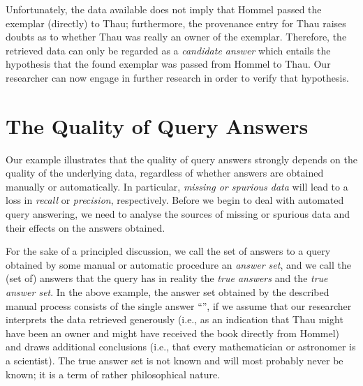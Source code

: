 Unfortunately, the data available does not imply that \foreignlanguage{ngerman}{Hommel} passed the exemplar (directly) to \foreignlanguage{ngerman}{Thau};
furthermore, the provenance entry for \foreignlanguage{ngerman}{Thau} raises doubts as to whether \foreignlanguage{ngerman}{Thau} was really an owner of the exemplar.
Therefore, the retrieved data can only be regarded as a \emph{candidate answer}
which entails the hypothesis that the found exemplar was passed from \foreignlanguage{ngerman}{Hommel} to \foreignlanguage{ngerman}{Thau}.
Our researcher can now engage in further research in order to verify that hypothesis.


\section{The Quality of Query Answers}
\label{sec:quality_of_answers}

Our example illustrates that the quality of query answers
strongly depends on the quality of the underlying data,
regardless of whether answers are obtained manually or automatically. 
In particular, \emph{missing or spurious data} will lead to 
a loss in \emph{recall} or \emph{precision}, respectively.
Before we begin to deal with automated query answering,
we need to analyse the sources of missing or spurious data and their effects on the answers obtained.

For the sake of a principled discussion, we call the set of answers to a query obtained by some manual or automatic procedure
an \emph{answer set}, and we call the (set of) answers that the query has in reality the \emph{true answers} and the \emph{true answer set}.
In the above example, the answer set obtained by the described manual process consists of the single answer
\enquote{}, if we assume that our researcher interprets the data retrieved generously
(i.e., as an indication that Thau might have been an owner and might have received the book directly from Hommel)
and draws additional conclusions (i.e., that every mathematician or astronomer is a scientist).
The true answer set is not known and will most probably never be known; it is a term of rather philosophical nature.

